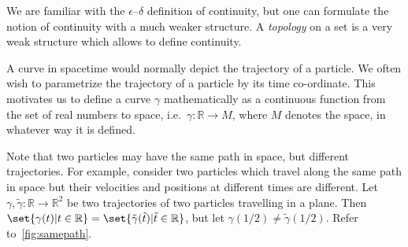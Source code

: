 \documentclass[a4 paper, oneside, 12pt]{book}
\theoremstyle{definition}
\newcommand{\rr}{\mathbb{R}}
\begin{document}
	We are familiar with the \(\epsilon–\delta\) definition of continuity, but one can formulate the notion of continuity with a much weaker structure. A \textit{topology} on a set is a very weak structure which allows to define continuity.

	A curve in spacetime would normally depict the trajectory of a particle. We often wish to parametrize the trajectory of a particle by its time co-ordinate. This motivates us to define a curve \(\gamma\) mathematically as a continuous function from the set of real numbers to space, i.e.\ \(\gamma \colon \rr \rightarrow M\), where \(M\) denotes the space, in whatever way it is defined.

	Note that two particles may have the same path in space, but different trajectories. For example, consider two particles which travel along the same path in space but their velocities and positions at different times are different. Let \(\gamma, \tilde\gamma \colon \rr \rightarrow \rr^2\) be two trajectories of two particles travelling in a plane. Then \(\set{\gamma(t) | t \in \rr} = \set{\tilde\gamma(\tilde t) | \tilde t \in \rr}\), but let \(\gamma(1/2) \neq \tilde\gamma(1/2)\). Refer to~\cref{fig:samepath}.
\end{document}
